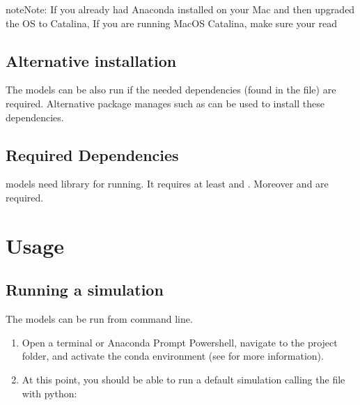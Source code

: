 \documentclass[letterpaper,10pt,english]{sphinxmanual}
\begin{document}
\begin{sphinxadmonition}{note}{Note:}
\sphinxAtStartPar
If you already had Anaconda installed on your Mac and then upgraded the OS to Catalina, If you are running MacOS Catalina, make sure your read 
\end{sphinxadmonition}


\subsection{Alternative installation}
\label{\detokenize{installation:alternative-installation}}
\sphinxAtStartPar
The models can be also run if the needed dependencies (found in the  file) are required. Alternative package manages such as  can be used to install these dependencies.


\subsection{Required Dependencies}
\label{\detokenize{installation:required-dependencies}}
\sphinxAtStartPar
{} models need  library for running. It requires at least  and . Moreover  and  are required.


\section{Usage}
\label{\detokenize{usage:usage}}\label{\detokenize{usage::doc}}

\subsection{Running a simulation}
\label{\detokenize{usage:running-a-simulation}}\label{\detokenize{usage:id1}}
\sphinxAtStartPar
The models can be run from command line.
\begin{enumerate}
%
\item {} 
\sphinxAtStartPar
Open a terminal or Anaconda Prompt Powershell, navigate to the project folder, and activate the conda environment (see {\hyperref[\detokenize{navigating::doc}]{}} for more information).

\item {} 
\sphinxAtStartPar
At this point, you should be able to run a default simulation calling the  file with python:

\end{enumerate}
\end{document}
